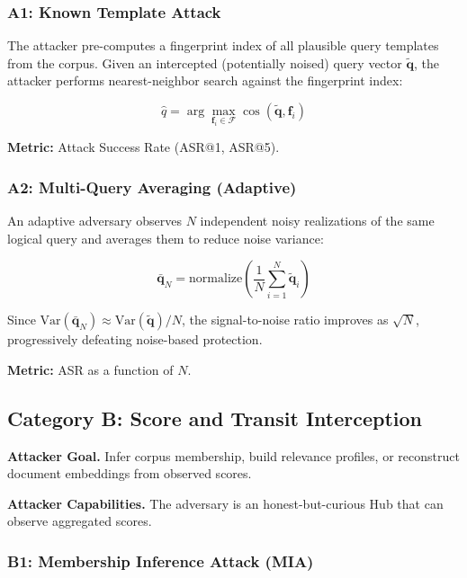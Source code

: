 \documentclass[conference]{IEEEtran}
\begin{document}
\subsubsection{A1: Known Template Attack}

The attacker pre-computes a fingerprint index of all plausible query templates from the corpus. Given an intercepted (potentially noised) query vector $\tilde{\mathbf{q}}$, the attacker performs nearest-neighbor search against the fingerprint index:

\begin{equation}
    \hat{q} = \arg\max_{\mathbf{f}_i \in \mathcal{F}} \cos(\tilde{\mathbf{q}}, \mathbf{f}_i)
\end{equation}

\textbf{Metric:} Attack Success Rate (ASR@1, ASR@5).

\subsubsection{A2: Multi-Query Averaging (Adaptive)}

An adaptive adversary observes $N$ independent noisy realizations of the same logical query and averages them to reduce noise variance:

\begin{equation}
    \bar{\mathbf{q}}_N = \text{normalize}\left(\frac{1}{N}\sum_{i=1}^{N} \tilde{\mathbf{q}}_i\right)
\end{equation}

Since $\text{Var}(\bar{\mathbf{q}}_N) \approx \text{Var}(\tilde{\mathbf{q}})/N$, the signal-to-noise ratio improves as $\sqrt{N}$, progressively defeating noise-based protection.

\textbf{Metric:} ASR as a function of $N$.

\subsection{Category B: Score and Transit Interception}

\textbf{Attacker Goal.} Infer corpus membership, build relevance profiles, or reconstruct document embeddings from observed scores.

\textbf{Attacker Capabilities.} The adversary is an honest-but-curious Hub that can observe aggregated scores.

\subsubsection{B1: Membership Inference Attack (MIA)}
\end{document}
